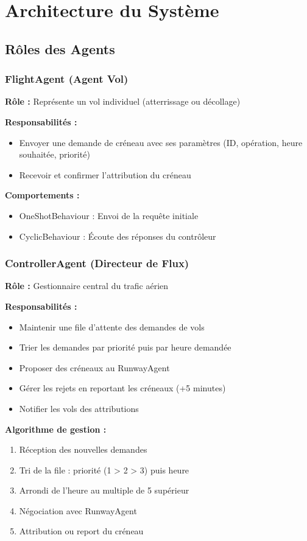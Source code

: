 \documentclass[12pt,a4paper]{article}
\begin{document}
\section{Architecture du Système}

\subsection{Rôles des Agents}

\subsubsection{FlightAgent (Agent Vol)}
\textbf{Rôle :} Représente un vol individuel (atterrissage ou décollage)

\textbf{Responsabilités :}
\begin{itemize}
    \item Envoyer une demande de créneau avec ses paramètres (ID, opération, heure souhaitée, priorité)
    \item Recevoir et confirmer l'attribution du créneau
\end{itemize}

\textbf{Comportements :}
\begin{itemize}
    \item OneShotBehaviour : Envoi de la requête initiale
    \item CyclicBehaviour : Écoute des réponses du contrôleur
\end{itemize}

\subsubsection{ControllerAgent (Directeur de Flux)}
\textbf{Rôle :} Gestionnaire central du trafic aérien

\textbf{Responsabilités :}
\begin{itemize}
    \item Maintenir une file d'attente des demandes de vols
    \item Trier les demandes par priorité puis par heure demandée
    \item Proposer des créneaux au RunwayAgent
    \item Gérer les rejets en reportant les créneaux (+5 minutes)
    \item Notifier les vols des attributions
\end{itemize}

\textbf{Algorithme de gestion :}
\begin{enumerate}
    \item Réception des nouvelles demandes
    \item Tri de la file : priorité (1 > 2 > 3) puis heure
    \item Arrondi de l'heure au multiple de 5 supérieur
    \item Négociation avec RunwayAgent
    \item Attribution ou report du créneau
\end{enumerate}
\end{document}
